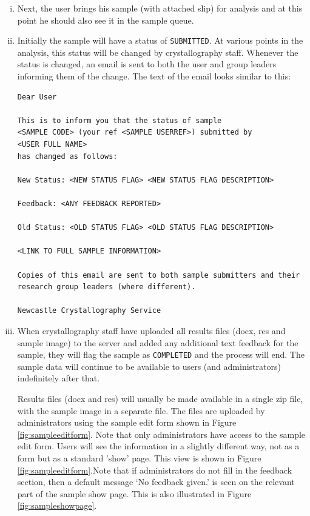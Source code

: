 \documentclass[12pt,twoside]{article}
\begin{document}
\begin{enumerate}[(i)]
\item
Next, the user brings his sample (with attached slip) for analysis and
at this point he should also see it in the sample queue.
\item
Initially the sample will have a status of \verb=SUBMITTED=. At various
points in the analysis, this status will be changed by crystallography
staff. Whenever the status is changed, an email is sent to both the user
and group leaders informing them of the change. The text of the email
looks similar to this:


\footnotesize
\begin{verbatim}
Dear User

This is to inform you that the status of sample
<SAMPLE CODE> (your ref <SAMPLE USERREF>) submitted by
<USER FULL NAME>
has changed as follows:

New Status: <NEW STATUS FLAG> <NEW STATUS FLAG DESCRIPTION>

Feedback: <ANY FEEDBACK REPORTED>

Old Status: <OLD STATUS FLAG> <OLD STATUS FLAG DESCRIPTION>

<LINK TO FULL SAMPLE INFORMATION>

Copies of this email are sent to both sample submitters and their
research group leaders (where different).

Newcastle Crystallography Service
\end{verbatim}
\normalsize

\item
When crystallography staff have uploaded all results files (docx, res and
sample image) to the server and added any additional text feedback for
the sample, they will flag the sample as \verb=COMPLETED= and the process
will end. The sample data will continue to be available to users
(and administrators) indefinitely after that.

Results files (docx and res) will usually be made available in a single 
zip file, with
the sample image in a separate file. The files are uploaded by
administrators using the sample edit form shown in 
Figure \ref{fig:sampleeditform}. Note that only administrators have access
to the sample edit form.
Users will see the information in a slightly different way, not as a form
but as a standard 'show' page. This view is shown in
Figure \ref{fig:sampleeditform}.Note that if administrators do not fill in the feedback section, then a
default message `No feedback given.' is seen on the relevant part of the
sample show page. This is also illustrated in 
Figure \ref{fig:sampleshowpage}.


\end{enumerate}
\end{document}
